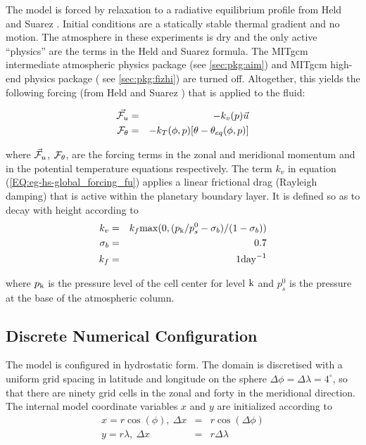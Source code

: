 The model is forced by relaxation to a radiative equilibrium profile 
from Held and Suarez \cite{held-suar:94}. Initial conditions are a
statically stable thermal gradient and no motion. The atmosphere 
in these experiments is dry and the only active ``physics'' are the
terms in the Held and Suarez \cite{held-suar:94} formula. The
MITgcm intermediate atmospheric physics package (see \ref{sec:pkg:aim}) and
MITgcm high-end physics package ( see \ref{sec:pkg:fizhi}) are turned off.
Altogether, this yields the following forcing 
(from Held and Suarez \cite{held-suar:94}) that is applied to the fluid:

\begin{eqnarray}
\label{EQ:eg-hs-global_forcing}
\label{EQ:eg-hs-global_forcing_fu}
\vec{{\cal F}_{u}} & = & -k_{v}(p)\vec{u}
\\
\label{EQ:eg-hs-global_forcing_ft}
{\cal F}_{\theta} & = & -k_{T}(\phi,p)[\theta-\theta_{eq}(\phi,p)]
\\
\end{eqnarray}

\noindent where ${\vec{\cal F}_{u}}$, ${\cal F}_{\theta}$,
are the forcing terms in the zonal and meridional
momentum and in the potential temperature
equations respectively.
The term $k_{v}$ in equation (\ref{EQ:eg-hs-global_forcing_fu}) applies a
linear frictional drag (Rayleigh damping) that is active within the
planetary boundary layer. It is defined so as to decay with
height according to
\begin{eqnarray}
\label{EQ:eg-hs-define_kv}
k_{v} & = & k_{f}{\rm max}(0,(p_{\rm{k}}/p^{0}_{s}-\sigma_{b})/(1-\sigma_{b}))
\\
\sigma_{b} & = & 0.7
\\
k_{f} & = & 1{\rm day}^{-1}
\end{eqnarray}

where $p_{\rm{k}}$ is the pressure level of the cell center for level $\rm{k}$ 
and $p^{0}_{s}$ is the pressure at the base of the atmospheric column.


\subsection{Discrete Numerical Configuration}
\label{www:tutorials}


 The model is configured in hydrostatic form.  The domain is discretised with 
a uniform grid spacing in latitude and longitude on the sphere
 $\Delta \phi=\Delta \lambda=4^{\circ}$, so 
that there are ninety grid cells in the zonal and forty in the 
meridional direction. The internal model coordinate variables
$x$ and $y$ are initialized according to
\begin{eqnarray}
x=r\cos(\phi),~\Delta x & = &r\cos(\Delta \phi) \\
y=r\lambda,~\Delta x &= &r\Delta \lambda 
\end{eqnarray}

